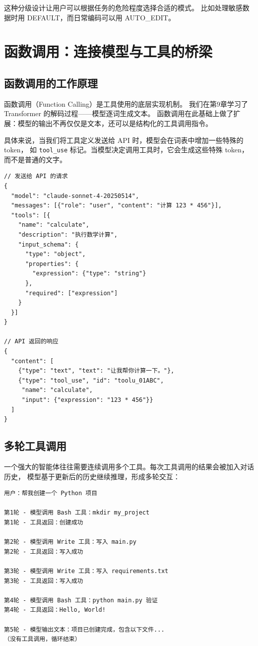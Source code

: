 这种分级设计让用户可以根据任务的危险程度选择合适的模式。
比如处理敏感数据时用 DEFAULT，而日常编码可以用 AUTO\_EDIT。

\section{函数调用：连接模型与工具的桥梁}
\subsection{函数调用的工作原理}
函数调用（Function Calling）是工具使用的底层实现机制。
我们在第9章学习了 Transformer 的解码过程——模型逐词生成文本。
函数调用在此基础上做了扩展：模型的输出不再仅仅是文本，还可以是结构化的工具调用指令。

具体来说，当我们将工具定义发送给 API 时，模型会在词表中增加一些特殊的 token，
如 \texttt{tool\_use} 标记。当模型决定调用工具时，它会生成这些特殊 token，
而不是普通的文字。

\begin{verbatim}
// 发送给 API 的请求
{
  "model": "claude-sonnet-4-20250514",
  "messages": [{"role": "user", "content": "计算 123 * 456"}],
  "tools": [{
    "name": "calculate",
    "description": "执行数学计算",
    "input_schema": {
      "type": "object",
      "properties": {
        "expression": {"type": "string"}
      },
      "required": ["expression"]
    }
  }]
}

// API 返回的响应
{
  "content": [
    {"type": "text", "text": "让我帮你计算一下。"},
    {"type": "tool_use", "id": "toolu_01ABC",
     "name": "calculate",
     "input": {"expression": "123 * 456"}}
  ]
}
\end{verbatim}

\subsection{多轮工具调用}
一个强大的智能体往往需要连续调用多个工具。每次工具调用的结果会被加入对话历史，
模型基于更新后的历史继续推理，形成多轮交互：

\begin{verbatim}
用户：帮我创建一个 Python 项目

第1轮 - 模型调用 Bash 工具：mkdir my_project
第1轮 - 工具返回：创建成功

第2轮 - 模型调用 Write 工具：写入 main.py
第2轮 - 工具返回：写入成功

第3轮 - 模型调用 Write 工具：写入 requirements.txt
第3轮 - 工具返回：写入成功

第4轮 - 模型调用 Bash 工具：python main.py 验证
第4轮 - 工具返回：Hello, World!

第5轮 - 模型输出文本：项目已创建完成，包含以下文件...
（没有工具调用，循环结束）
\end{verbatim}

